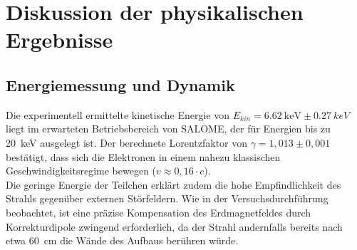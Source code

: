 \documentclass[10pt,a4paper, bibliography=totoc]{scrartcl}
\begin{document}
\section{Diskussion der physikalischen Ergebnisse}
\subsection{Energiemessung und Dynamik}
Die experimentell ermittelte kinetische Energie von $E_{kin} = \qty{6,62}{\keV} \pm \qty{0,27}{keV}$ liegt im erwarteten Betriebsbereich von SALOME, der für Energien bis zu \qty{20}{keV} ausgelegt ist. Der berechnete Lorentzfaktor von $\gamma = 1,013 \pm 0,001$ bestätigt, dass sich die Elektronen in einem nahezu klassischen Geschwindigkeitsregime bewegen ($v \approx 0,16\cdot c$).\\
Die geringe Energie der Teilchen erklärt zudem die hohe Empfindlichkeit des Strahls gegenüber externen Störfeldern. Wie in der Versuchsdurchführung beobachtet, ist eine präzise Kompensation des Erdmagnetfeldes durch Korrekturdipole zwingend erforderlich, da der Strahl andernfalls bereits nach etwa \qty{60}{cm} die Wände des Aufbaus berühren würde.
\end{document}
